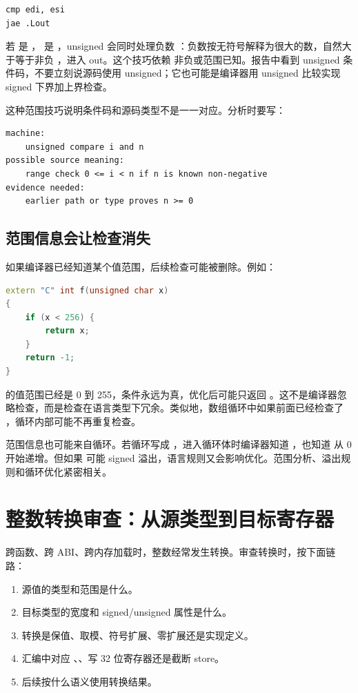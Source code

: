 \begin{lstlisting}
cmp edi, esi
jae .Lout
\end{lstlisting}

若  是 ， 是 ，unsigned  会同时处理负数 ：负数按无符号解释为很大的数，自然大于等于非负 ，进入 out。这个技巧依赖  非负或范围已知。报告中看到 unsigned 条件码，不要立刻说源码使用 unsigned；它也可能是编译器用 unsigned 比较实现 signed 下界加上界检查。

这种范围技巧说明条件码和源码类型不是一一对应。分析时要写：

\begin{lstlisting}
machine:
    unsigned compare i and n
possible source meaning:
    range check 0 <= i < n if n is known non-negative
evidence needed:
    earlier path or type proves n >= 0
\end{lstlisting}

\subsection{范围信息会让检查消失}

如果编译器已经知道某个值范围，后续检查可能被删除。例如：

\begin{lstlisting}[language=C++]
extern "C" int f(unsigned char x)
{
    if (x < 256) {
        return x;
    }
    return -1;
}
\end{lstlisting}

 的值范围已经是 0 到 255，条件永远为真，优化后可能只返回 。这不是编译器忽略检查，而是检查在语言类型下冗余。类似地，数组循环中如果前面已经检查了 ，循环内部可能不再重复检查。

范围信息也可能来自循环。若循环写成 ，进入循环体时编译器知道 ，也知道  从 0 开始递增。但如果  可能 signed 溢出，语言规则又会影响优化。范围分析、溢出规则和循环优化紧密相关。

\section{整数转换审查：从源类型到目标寄存器}

跨函数、跨 ABI、跨内存加载时，整数经常发生转换。审查转换时，按下面链路：

\begin{enumerate}
  \item 源值的类型和范围是什么。
  \item 目标类型的宽度和 signed/unsigned 属性是什么。
  \item 转换是保值、取模、符号扩展、零扩展还是实现定义。
  \item 汇编中对应 、、写 32 位寄存器还是截断 store。
  \item 后续按什么语义使用转换结果。
\end{enumerate}


